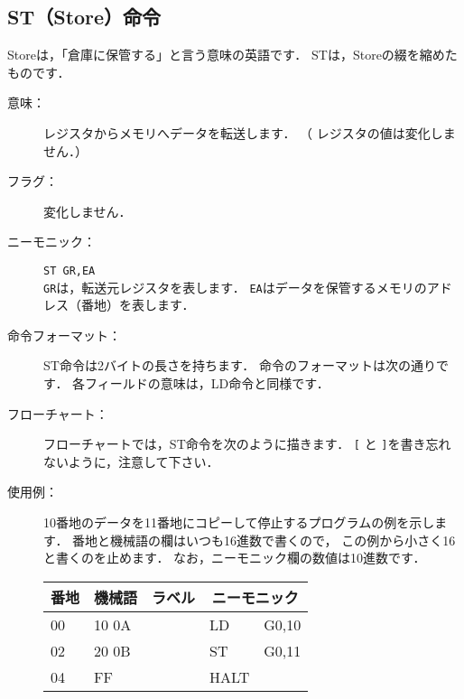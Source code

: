 \newpage
\subsection{ST（Store）命令}
Storeは，「倉庫に保管する」と言う意味の英語です．
STは，Storeの綴を縮めたものです．

\begin{description}
\item[意味：]レジスタからメモリへデータを転送します．
（
レジスタの値は変化しません．） 

\item[フラグ：]変化しません．

\item[ニーモニック：]{\tt ST  GR,EA} \\
{\tt GR}は，転送元レジスタを表します．
{\tt EA}はデータを保管するメモリのアドレス（番地）を表します．

\item[命令フォーマット：]ST命令は2バイトの長さを持ちます．
命令のフォーマットは次の通りです．
各フィールドの意味は，LD命令と同様です．


\item[フローチャート：]フローチャートでは，ST命令を次のように描きます．
{\tt [} と {\tt ]}を書き忘れないように，注意して下さい．

\begin{center}
\end{center}

\item[使用例：]
10番地のデータを11番地にコピーして停止するプログラムの例を示します．
番地と機械語の欄はいつも16進数で書くので，
この例から小さく16と書くのを止めます．
なお，ニーモニック欄の数値は10進数です．

{\tt\small\begin{center}
\begin{tabular}{|l|l|l|l l|} \hline
番地 & 機械語 & ラベル & \multicolumn{2}{|c|}{ニーモニック} \\
\hline
00 & 10 0A & & LD   & G0,10 \\
02 & 20 0B & & ST   & G0,11 \\
04 & FF    & & HALT & \\
\hline
\end{tabular}
\end{center}}
\end{description}

